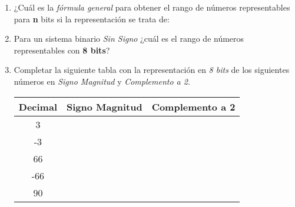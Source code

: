 \documentclass[12pt]{article}
\begin{document}
\begin{enumerate}
\item ¿Cuál es la \emph{fórmula general} para obtener el rango de números
    representables para \textbf{n} bits si la representación se trata de:


\item Para un sistema binario \emph{Sin Signo} ¿cuál es el rango de números
    representables con \textbf{8 bits}?

\item Completar la siguiente tabla con la representación en \emph{8 bits} de
    los siguientes números en \emph{Signo Magnitud} y \emph{Complemento a 2}.

    \begin{center}

        \begin{tabular}[t]{|c|c|c|}

        \hline

            \textbf{Decimal} & \textbf{Signo Magnitud} & \textbf{Complemento a
            2}\\

        \hline

            3 & \hspace{14em}~&\hspace{14em}~\\

        \hline

            -3&&\\

        \hline

            66&&\\

        \hline

            -66&&\\

        \hline

            90&&\\


\end{tabular}
\end{center}
\end{enumerate}
\end{document}
